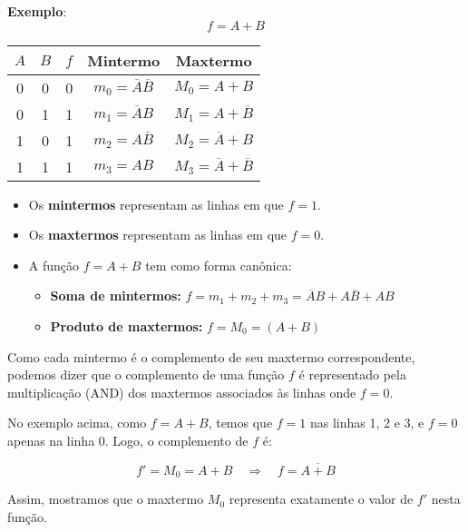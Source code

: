 \documentclass[12pt]{article}
\begin{document}
\vspace{0.5cm}

\textbf{Exemplo}:
\[
f = A + B
\]

\begin{center}
\begin{tabular}{|c|c|c|c|c|}
\hline
$A$  & $B$ & $f$ & Mintermo & Maxtermo \\
\hline
0 & 0 & 0 & $m_0 = \overline{A}\overline{B}$ & $M_0 = A + B$ \\
0 & 1 & 1 & $m_1 = \overline{A}B$            & $M_1 = A + \overline{B}$ \\
1 & 0 & 1 & $m_2 = A\overline{B}$            & $M_2 = \overline{A} + B$ \\
1 & 1 & 1 & $m_3 = AB$                       & $M_3 = \overline{A} + \overline{B}$ \\
\hline
\end{tabular}
\end{center}

\begin{itemize}
   \item Os \textbf{mintermos} representam as linhas em que $f = 1$.
   \item Os \textbf{maxtermos} representam as linhas em que $f = 0$.
   \item A função $f = A + B$ tem como forma canônica:
   \begin{itemize}
      \item \textbf{Soma de mintermos:} $f = m_1 + m_2 + m_3 = \overline{A}B + A\overline{B} + AB$
      \item \textbf{Produto de maxtermos:} $f = M_0 = (A + B)$
   \end{itemize}
\end{itemize}

\begin{tcolorbox}[mynote, title=Mintermos, Maxtermos e Complemento]
Como cada mintermo é o complemento de seu maxtermo correspondente, podemos dizer que o complemento de uma função $f$ é representado pela multiplicação (AND) dos maxtermos associados às linhas onde $f = 0$.

No exemplo acima, como $f = A + B$, temos que $f = 1$ nas linhas 1, 2 e 3, e $f = 0$ apenas na linha 0. Logo, o complemento de $f$ é:

\[
f' = M_0 = A + B
\quad \Rightarrow \quad f = \overline{A + B}
\]

Assim, mostramos que o maxtermo $M_0$ representa exatamente o valor de $f'$ nesta função.
\end{tcolorbox}
\end{document}
